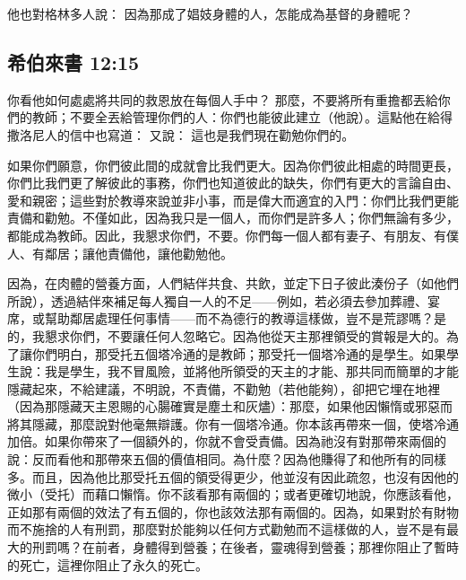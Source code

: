  他也對格林多人說： 因為那成了娼妓身體的人，怎能成為基督的身體呢？\par


\subsection{希伯來書 12:15}

 你看他如何處處將共同的救恩放在每個人手中？ 那麼，不要將所有重擔都丟給你們的教師；不要全丟給管理你們的人：你們也能彼此建立（他說）。這點他在給得撒洛尼人的信中也寫道： 又說： 這也是我們現在勸勉你們的。\par

如果你們願意，你們彼此間的成就會比我們更大。因為你們彼此相處的時間更長，你們比我們更了解彼此的事務，你們也知道彼此的缺失，你們有更大的言論自由、愛和親密；這些對於教導來說並非小事，而是偉大而適宜的入門：你們比我們更能責備和勸勉。不僅如此，因為我只是一個人，而你們是許多人；你們無論有多少，都能成為教師。因此，我懇求你們，不要。你們每一個人都有妻子、有朋友、有僕人、有鄰居；讓他責備他，讓他勸勉他。\par

因為，在肉體的營養方面，人們結伴共食、共飲，並定下日子彼此湊份子（如他們所說），透過結伴來補足每人獨自一人的不足——例如，若必須去參加葬禮、宴席，或幫助鄰居處理任何事情——而不為德行的教導這樣做，豈不是荒謬嗎？是的，我懇求你們，不要讓任何人忽略它。因為他從天主那裡領受的賞報是大的。為了讓你們明白，那受托五個塔冷通的是教師；那受托一個塔冷通的是學生。如果學生說：我是學生，我不冒風險，並將他所領受的天主的才能、那共同而簡單的才能隱藏起來，不給建議，不明說，不責備，不勸勉（若他能夠），卻把它埋在地裡（因為那隱藏天主恩賜的心腸確實是塵土和灰燼）：那麼，如果他因懶惰或邪惡而將其隱藏，那麼說對他毫無辯護。你有一個塔冷通。你本該再帶來一個，使塔冷通加倍。如果你帶來了一個額外的，你就不會受責備。因為祂沒有對那帶來兩個的說：反而看他和那帶來五個的價值相同。為什麼？因為他賺得了和他所有的同樣多。而且，因為他比那受托五個的領受得更少，他並沒有因此疏忽，也沒有因他的微小（受托）而藉口懶惰。你不該看那有兩個的；或者更確切地說，你應該看他，正如那有兩個的效法了有五個的，你也該效法那有兩個的。因為，如果對於有財物而不施捨的人有刑罰，那麼對於能夠以任何方式勸勉而不這樣做的人，豈不是有最大的刑罰嗎？在前者，身體得到營養；在後者，靈魂得到營養；那裡你阻止了暫時的死亡，這裡你阻止了永久的死亡。\par

